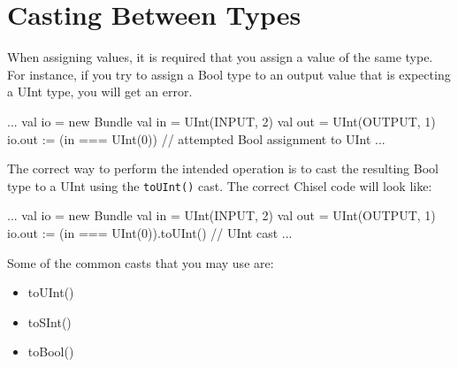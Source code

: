 \documentclass[twocolumn, 10pt]{article}
\begin{document}
\section{Casting Between Types}

When assigning values, it is required that you assign a value of the same type. For instance, if you try to assign a Bool type to an output value that is expecting a UInt type, you will get an error.

\begin{scala}
  ...
  val io  = new Bundle {
    val in  = UInt(INPUT, 2)
    val out = UInt(OUTPUT, 1)
  }
  io.out := (in === UInt(0)) // attempted Bool assignment to UInt
  ...
\end{scala}

The correct way to perform the intended operation is to cast the resulting Bool type to a UInt using the \verb+toUInt()+ cast. The correct Chisel code will look like:

\begin{scala}
  ...
  val io = new Bundle {
    val in  = UInt(INPUT, 2)
    val out = UInt(OUTPUT, 1)
  }
  io.out := (in === UInt(0)).toUInt() // UInt cast
  ...
\end{scala}

Some of the common casts that you may use are:

\begin{itemize}
\item toUInt()
\item toSInt()
\item toBool()
\end{itemize}
\end{document}
